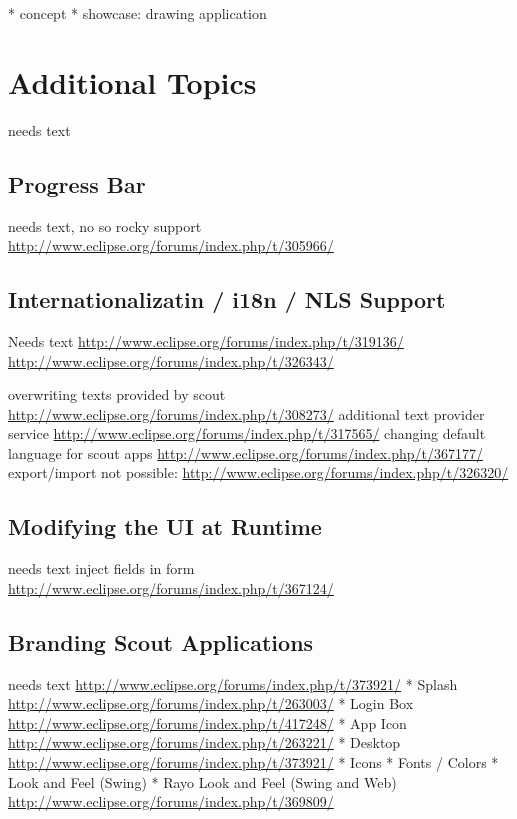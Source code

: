 \documentclass[a4paper,10pt,twoside]{book}
\begin{document}
  * concept
  * showcase: drawing application
    
\chapter{Additional Topics}
needs text

\section{Progress Bar}
needs text, no so rocky support \url{http://www.eclipse.org/forums/index.php/t/305966/}

\section{Internationalizatin / i18n / NLS Support}
Needs text 
\url{http://www.eclipse.org/forums/index.php/t/319136/}
\url{http://www.eclipse.org/forums/index.php/t/326343/}

overwriting texts provided by scout \url{http://www.eclipse.org/forums/index.php/t/308273/}
additional text provider service \url{http://www.eclipse.org/forums/index.php/t/317565/}
changing default language for scout apps \url{http://www.eclipse.org/forums/index.php/t/367177/}
export/import not possible: \url{http://www.eclipse.org/forums/index.php/t/326320/}

\section{Modifying the UI at Runtime}
needs text
inject fields in form \url{http://www.eclipse.org/forums/index.php/t/367124/}

\section{Branding Scout Applications}

needs text
\url{http://www.eclipse.org/forums/index.php/t/373921/}
* Splash \url{http://www.eclipse.org/forums/index.php/t/263003/}
* Login Box \url{http://www.eclipse.org/forums/index.php/t/417248/}
* App Icon \url{http://www.eclipse.org/forums/index.php/t/263221/}
* Desktop \url{http://www.eclipse.org/forums/index.php/t/373921/}
* Icons
* Fonts / Colors
* Look and Feel (Swing)
* Rayo Look and Feel (Swing and Web)
\url{http://www.eclipse.org/forums/index.php/t/369809/}
\end{document}
